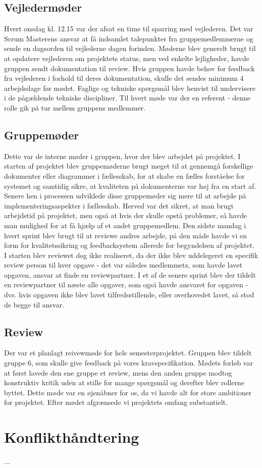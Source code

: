 \documentclass[a4paper,12pt,fleqn,oneside]{article}
\begin{document}
\subsection{Vejledermøder}
Hvert onsdag kl. 12.15 var der afsat en time til sparring med vejlederen. Det var Scrum Masterens ansvar at få indsamlet talepunkter fra gruppemedlemmerne og sende en dagsorden til vejlederne dagen forinden. Møderne blev generelt brugt til at opdatere vejlederen om projektets status, men ved enkelte lejligheder, havde gruppen sendt dokumentation til review. Hvis gruppen havde behov for feedback fra vejlederen i forhold til deres dokumentation, skulle det sendes minimum 4 arbejdsdage før mødet. Faglige og tekniske spørgsmål blev henvist til undervisere i de pågældende tekniske discipliner. Til hvert møde var der en referent - denne rolle gik på tur mellem gruppens medlemmer. 

\subsection{Gruppemøder}
Dette var de interne møder i gruppen, hvor der blev arbejdet på projektet. I starten af projektet blev gruppemøderne brugt meget til at gennemgå forskellige dokumenter eller diagrammer i fællesskab, for at skabe en fælles forståelse for systemet og samtidig sikre, at kvaliteten på dokumenterne var høj fra en start af. Senere hen i processen udviklede disse gruppemøder sig mere til at arbejde på implementeringsaspekter i fællesskab. Herved var det sikret, at man brugt arbejdstid på projektet, men også at hvis der skulle opstå problemer, så havde man mulighed for at få hjælp af et andet gruppemedlem. Den sidste mandag i hvert sprint blev brugt til at reviewe andres arbejde, på den måde havde vi en form for kvalitetssikring og feedbacksystem allerede for begyndelsen af projektet. I starten blev reviewet dog ikke realiseret, da der ikke blev uddelegeret en specifik review person til hver opgave - det var således medlemmetz, som havde lavet opgaven, ansvar at finde en reviewpartner. I et af de senere sprint blev der tildelt en reviewpartner til næste alle opgaver, som også havde ansvaret for opgaven - dvs. hvis opgaven ikke blev lavet tilfredsstillende, eller overhovedet lavet, så stod de begge til ansvar. 

\subsection{Review}
Der var et planlagt reivewmøde for hele semesterprojektet. Gruppen blev tildelt gruppe 6, som skulle give feedback på vores kravspecifikation. Mødets forløb var at først lavede den ene gruppe et review, mens den anden gruppe modtog konstruktiv kritik uden at stille for mange spørgsmål og derefter blev rollerne byttet. Dette møde var en øjenåbner for os, da vi havde alt for store ambitioner for projektet. Efter mødet afgrænsede vi projektets omfang substantielt. 

\section{Konflikthåndtering}
...

\printbibliography
\end{document}

